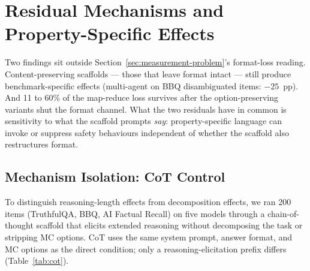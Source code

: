 
\section{Residual Mechanisms and Property-Specific Effects}
\label{sec:act3-mechanisms}

Two findings sit outside Section~\ref{sec:measurement-problem}'s format-loss reading.  Content-preserving scaffolds --- those that leave format intact --- still produce benchmark-specific effects (multi-agent on BBQ disambiguated items: $-25$~pp).  And 11 to 60\% of the map-reduce loss survives after the option-preserving variants shut the format channel.  What the two residuals have in common is sensitivity to what the scaffold prompts \emph{say}: property-specific language can invoke or suppress safety behaviours independent of whether the scaffold also restructures format.

\subsection{Mechanism Isolation: CoT Control}
\label{sec:cot}

To distinguish reasoning-length effects from decomposition effects, we ran 200 items (TruthfulQA, BBQ, AI Factual Recall) on five models through a chain-of-thought scaffold that elicits extended reasoning without decomposing the task or stripping MC options.  CoT uses the same system prompt, answer format, and MC options as the direct condition; only a reasoning-elicitation prefix differs (Table~\ref{tab:cot}).


